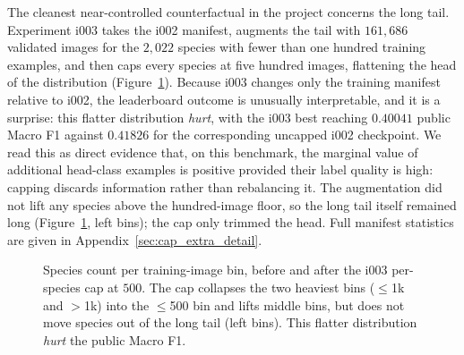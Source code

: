 The cleanest near-controlled counterfactual in the project concerns the long tail. Experiment
i003 takes the i002 manifest, augments the tail with $161{,}686$ validated images for the
$2{,}022$ species with fewer than one hundred training examples, and then caps every species at
five hundred images, flattening the head of the distribution (Figure~\ref{fig:long_tail}).
Because i003 changes only the training manifest relative to i002, the leaderboard outcome is
unusually interpretable, and it is a surprise: this flatter distribution \emph{hurt}, with the
i003 best reaching $0.40041$ public Macro F1 against $0.41826$ for the corresponding uncapped
i002 checkpoint. We read this as direct evidence that, on this benchmark, the marginal value of
additional head-class examples is positive provided their label quality is high: capping discards
information rather than rebalancing it. The augmentation did not lift any species above the
hundred-image floor, so the long tail itself remained long (Figure~\ref{fig:long_tail}, left
bins); the cap only trimmed the head. Full manifest statistics are given in
Appendix~\ref{sec:cap_extra_detail}.

\begin{figure}[!htbp]
  \centering
  
  \caption{Species count per training-image bin, before and after the i003 per-species cap at $500$. The cap collapses the two heaviest bins ($\le$1k and $>$1k) into the $\le$500 bin and lifts middle bins, but does not move species out of the long tail (left bins). This flatter distribution \emph{hurt} the public Macro F1.}
  \label{fig:long_tail}
\end{figure}
